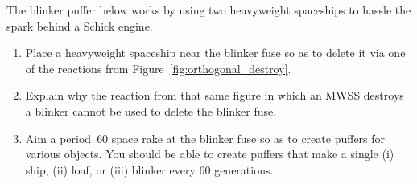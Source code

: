 \begin{multicols}{2}
	
	\mfilbreak
	
	
	\begin{problem}\label{exer:schick_engine_blinker_puffer} 
		The blinker puffer below works by using two heavyweight spaceships to hassle the spark behind a Schick engine.
		
		\begin{center}
		\end{center}
		
		\begin{enumerate}[label=\bf\color{ocre}(\alph*)]
			\item Place a heavyweight spaceship near the blinker fuse so as to delete it via one of the reactions from Figure~\ref{fig:orthogonal_destroy}.
			
			\item Explain why the reaction from that same figure in which an MWSS destroys a blinker cannot be used to delete the blinker fuse.
			
			\item Aim a period~$60$ space rake at the blinker fuse so as to create puffers for various objects. You should be able to create puffers that make a single (i) ship, (ii) loaf, or (iii) blinker every $60$ generations.
		\end{enumerate}
	\end{problem}
	
	
	
	
	
	
	
	
	
\end{multicols}
\normalsize\vspace*{0.01cm}\ifdefined\FORPRINTING{}\else%
\fi
